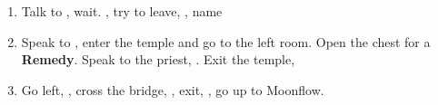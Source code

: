 \begin{enumerate}[resume]
	\item Talk to \auron, wait. \sd, try to leave, \sd, name \ixilon
	\item Speak to \auron, enter the temple and go to the left room. Open the chest for a \textbf{Remedy}. Speak to the priest, \sd. Exit the temple, \sd
	\item Go left, , cross the bridge, \sd, exit, \sd, go up to Moonflow.
\end{enumerate}